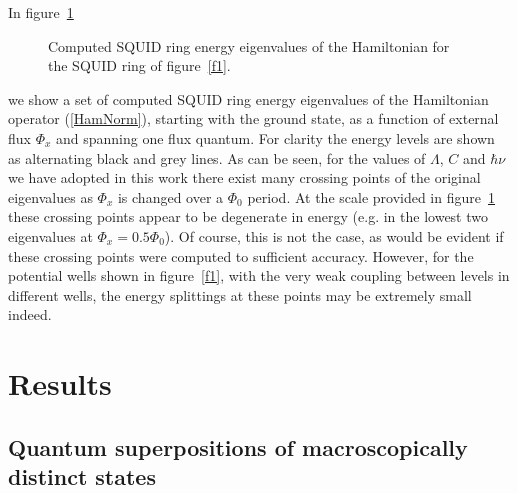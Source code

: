\documentclass[twocolumn,a4paper,superscriptaddress,showpacs,floatfix,pra]{revtex4}
\begin{document}
In figure~\ref{f2} 
\begin{figure}[!t]
\begin{center}
\end{center}
\caption{Computed SQUID ring energy eigenvalues of the Hamiltonian for the
SQUID ring of figure~\protect\ref{f1}. }
\label{f2}
\end{figure}
we  show  a set  of  computed SQUID  ring  energy  eigenvalues of  the
Hamiltonian operator (\ref{HamNorm}),  starting with the ground state,
as  a function  of external  flux $\Phi  _{x}$ and  spanning  one flux
quantum. For clarity the energy  levels are shown as alternating black
and grey lines. As can be seen,  for the values of $\Lambda $, $C$ and
$\hbar \nu  $ we have adopted  in this work there  exist many crossing
points of  the original eigenvalues as  $\Phi _{x}$ is  changed over a
$\Phi  _{0}$ period. At  the scale  provided in  figure~\ref{f2} these
crossing points appear to be  degenerate in energy (e.g. in the lowest
two eigenvalues at  $\Phi _{x}=0.5\Phi _{0}$). Of course,  this is not
the case, as  would be evident if these  crossing points were computed
to  sufficient accuracy.  However, for  the potential  wells  shown in
figure~\ref{f1},  with  the  very  weak  coupling  between  levels  in
different  wells,  the  energy  splittings  at  these  points  may  be
extremely small indeed.

\section*{Results}

\subsection*{Quantum superpositions of macroscopically distinct states}
\end{document}
